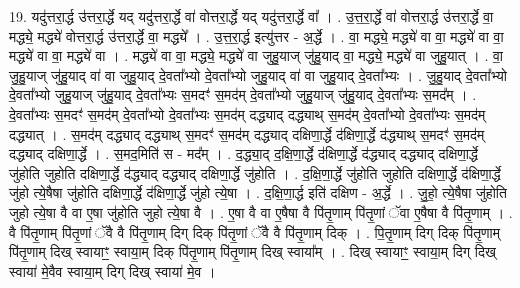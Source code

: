 \documentclass[17pt]{extarticle}
\begin{document}
19. यदु॑त्तरा॒र्द्ध उ॑त्तरा॒र्द्धे यद् यदु॑त्तरा॒र्द्धे वा॑ वोत्तरा॒र्द्धे यद् यदु॑त्तरा॒र्द्धे वा᳚ । . उ॒त्त॒रा॒र्द्धे वा॑ वोत्तरा॒र्द्ध उ॑त्तरा॒र्द्धे वा॒ मद्ध्ये॒ मद्ध्ये॑ वोत्तरा॒र्द्ध उ॑त्तरा॒र्द्धे वा॒ मद्ध्ये᳚ । . उ॒त्त॒रा॒र्द्ध इत्यु॑त्तर - अ॒र्द्धे । . वा॒ मद्ध्ये॒ मद्ध्ये॑ वा वा॒ मद्ध्ये॑ वा वा॒ मद्ध्ये॑ वा वा॒ मद्ध्ये॑ वा । . मद्ध्ये॑ वा वा॒ मद्ध्ये॒ मद्ध्ये॑ वा जुहु॒याज् जु॑हु॒याद् वा॒ मद्ध्ये॒ मद्ध्ये॑ वा जुहु॒यात् । . वा॒ जु॒हु॒याज् जु॑हु॒याद् वा॑ वा जुहु॒याद् दे॒वता᳚भ्यो दे॒वता᳚भ्यो जुहु॒याद् वा॑ वा जुहु॒याद् दे॒वता᳚भ्यः । . जु॒हु॒याद् दे॒वता᳚भ्यो दे॒वता᳚भ्यो जुहु॒याज् जु॑हु॒याद् दे॒वता᳚भ्यः स॒मदꣳ॑ स॒मद॑म् दे॒वता᳚भ्यो जुहु॒याज् जु॑हु॒याद् दे॒वता᳚भ्यः स॒मद᳚म् । . दे॒वता᳚भ्यः स॒मदꣳ॑ स॒मद॑म् दे॒वता᳚भ्यो दे॒वता᳚भ्यः स॒मद॑म् दद्ध्याद् दद्ध्याथ् स॒मद॑म् दे॒वता᳚भ्यो दे॒वता᳚भ्यः स॒मद॑म् दद्ध्यात् । . स॒मद॑म् दद्ध्याद् दद्ध्याथ् स॒मदꣳ॑ स॒मद॑म् दद्ध्याद् दक्षिणा॒र्द्धे द॑क्षिणा॒र्द्धे द॑द्ध्याथ् स॒मदꣳ॑ स॒मद॑म् दद्ध्याद् दक्षिणा॒र्द्धे । . स॒मद॒मिति॑ स - मद᳚म् । . द॒द्ध्या॒द् द॒क्षि॒णा॒र्द्धे द॑क्षिणा॒र्द्धे द॑द्ध्याद् दद्ध्याद् दक्षिणा॒र्द्धे जु॑होति जुहोति दक्षिणा॒र्द्धे द॑द्ध्याद् दद्ध्याद् दक्षिणा॒र्द्धे जु॑होति । . द॒क्षि॒णा॒र्द्धे जु॑होति जुहोति दक्षिणा॒र्द्धे द॑क्षिणा॒र्द्धे जु॑हो त्ये॒षैषा जु॑होति दक्षिणा॒र्द्धे द॑क्षिणा॒र्द्धे जु॑हो त्ये॒षा । . द॒क्षि॒णा॒र्द्ध इति॑ दक्षिण - अ॒र्द्धे । . जु॒हो॒ त्ये॒षैषा जु॑होति जुहो त्ये॒षा वै वा ए॒षा जु॑होति जुहो त्ये॒षा वै । . ए॒षा वै वा ए॒षैषा वै पि॑तृ॒णाम् पि॑तृ॒णां ॅवा ए॒षैषा वै पि॑तृ॒णाम् । . वै पि॑तृ॒णाम् पि॑तृ॒णां ॅवै वै पि॑तृ॒णाम् दिग् दिक् पि॑तृ॒णां ॅवै वै पि॑तृ॒णाम् दिक् । . पि॒तृ॒णाम् दिग् दिक् पि॑तृ॒णाम् पि॑तृ॒णाम् दिख् स्वायाꣳ॒॒ स्वाया॒म् दिक् पि॑तृ॒णाम् पि॑तृ॒णाम् दिख् स्वाया᳚म् । . दिख् स्वायाꣳ॒॒ स्वाया॒म् दिग् दिख् स्वाया॑ मे॒वैव स्वाया॒म् दिग् दिख् स्वाया॑ मे॒व । \newline
\end{document}
